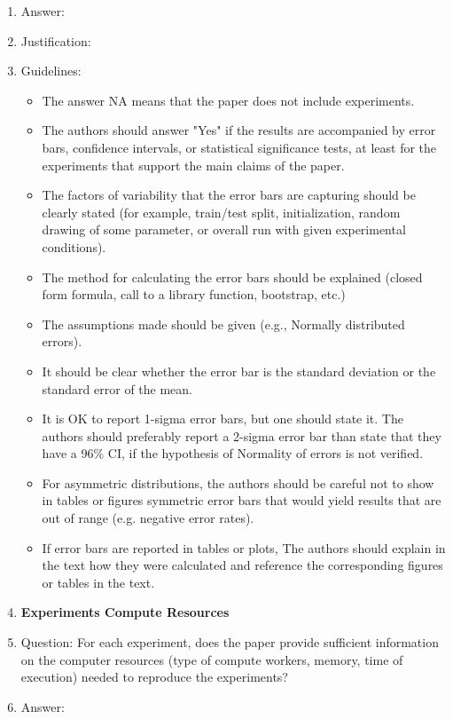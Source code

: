 \documentclass{article}
\begin{document}
\begin{enumerate}
    \item[] Answer: \answerYes{}
    \item[] Justification: \justificationTODO{}
    \item[] Guidelines:
    \begin{itemize}
        \item The answer NA means that the paper does not include experiments.
        \item The authors should answer "Yes" if the results are accompanied by error bars, confidence intervals, or statistical significance tests, at least for the experiments that support the main claims of the paper.
        \item The factors of variability that the error bars are capturing should be clearly stated (for example, train/test split, initialization, random drawing of some parameter, or overall run with given experimental conditions).
        \item The method for calculating the error bars should be explained (closed form formula, call to a library function, bootstrap, etc.)
        \item The assumptions made should be given (e.g., Normally distributed errors).
        \item It should be clear whether the error bar is the standard deviation or the standard error of the mean.
        \item It is OK to report 1-sigma error bars, but one should state it. The authors should preferably report a 2-sigma error bar than state that they have a 96\% CI, if the hypothesis of Normality of errors is not verified.
        \item For asymmetric distributions, the authors should be careful not to show in tables or figures symmetric error bars that would yield results that are out of range (e.g. negative error rates).
        \item If error bars are reported in tables or plots, The authors should explain in the text how they were calculated and reference the corresponding figures or tables in the text.
    \end{itemize}
\item {\bf Experiments Compute Resources}
    \item[] Question: For each experiment, does the paper provide sufficient information on the computer resources (type of compute workers, memory, time of execution) needed to reproduce the experiments?
    \item[] Answer: \answerYes{}

\end{enumerate}
\end{document}
